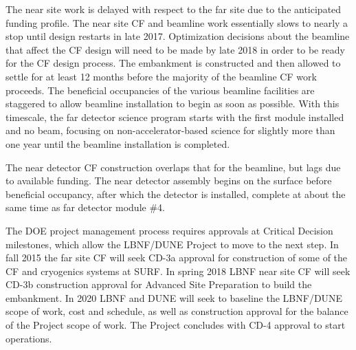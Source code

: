 The near site work is delayed with respect to the far site due to the anticipated funding profile. The near site CF and beamline work essentially slows to nearly a stop %
until design restarts in late 2017. Optimization decisions about the beamline that affect the CF design will need to be made by late 2018 in order to be ready for the CF design process. The embankment is constructed and then allowed to settle for at least 12 months before the majority of the beamline CF work proceeds. The beneficial occupancies of the various beamline facilities %
are staggered to allow beamline installation to begin as soon as possible. With this timescale, the far detector science program %
starts with the first module installed and no beam, focusing on non-accelerator-based science %
for slightly more than one year until 
the beamline installation is completed.


The near detector CF construction overlaps that for the beamline, but lags due to available funding. The near detector assembly begins on the surface before beneficial occupancy, after which the detector is installed, complete at about the same time as far detector module \#4. 

The DOE project management process requires approvals at Critical Decision milestones, which allow the LBNF/DUNE Project to move to the next step. In fall 2015 the far site CF will seek CD-3a approval for construction of some of the CF and cryogenics systems at SURF. In spring 2018 LBNF near site CF will seek CD-3b construction approval for Advanced Site Preparation to build the embankment. In 2020 LBNF and DUNE will seek to baseline the LBNF/DUNE scope of work, cost and schedule, as well as construction approval for the balance of the Project scope of work. 
The Project concludes with CD-4 approval to start operations.

